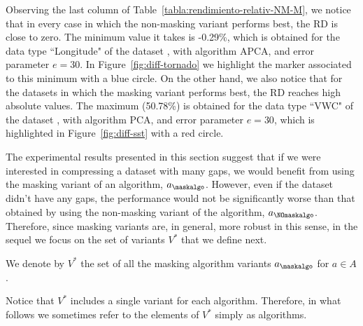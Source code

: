 Observing the last column of Table~\ref{tabla:rendimiento-relativ-NM-M}, we notice that in every case in which the non-masking variant performs best, the RD is close to zero. The minimum value it takes is -0.29\%, which is obtained for the data type ``Longitude" of the dataset \datasettornado, with algorithm APCA, and error parameter $e=30$. In Figure~\ref{fig:diff-tornado} we highlight the marker associated to this minimum with a blue circle. On the other hand, we also notice that for the datasets in which the masking variant performs best, the RD reaches high absolute values. The maximum (50.78\%) is obtained for the data type ``VWC" of the dataset \datasetsst, with algorithm PCA, and error parameter $e=30$, which is highlighted in Figure~\ref{fig:diff-sst} with a red circle.


The experimental results presented in this section suggest that if we were interested in compressing a dataset with many gaps, we would benefit from using the masking variant of an algorithm, $a_\maskalgo$. However, even if the dataset didn't have any gaps, the performance would not be significantly worse than that obtained by using the non-masking variant of the algorithm, $a_\NOmaskalgo$. Therefore, since masking variants are, in general, more robust in this sense, in the sequel we focus on the set of variants $V^*$ that we define next.


\vspace{+5pt}
\begin{defcion}
We denote by $V^*$ the set of all the masking algorithm variants $a_\maskalgo$ for $a \in A$.
\end{defcion}


Notice that $V^*$ includes a single variant for each algorithm. Therefore, in what follows we sometimes refer to the elements of $V^*$ simply as algorithms.

